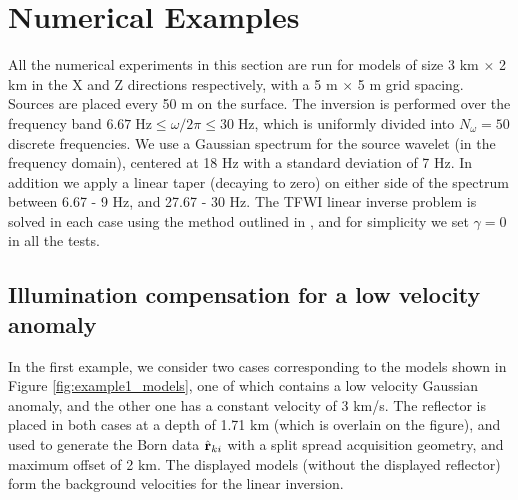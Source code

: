 \section{Numerical Examples}
\vspace*{-0.2cm}
All the numerical experiments in this section are run for models of size 3 km $\times$ 2 km in the X and Z directions respectively, with a 5 m $\times$ 5 m grid spacing. Sources are placed every 50 m on the surface. The inversion is performed over the frequency band $6.67 \; \text{Hz} \leq \omega / 2 \pi \leq 30 \; \text{Hz}$, which is uniformly divided into $N_\omega = 50$ discrete frequencies. We use a Gaussian spectrum for the source wavelet (in the frequency domain), centered at 18 Hz with a standard deviation of 7 Hz. In addition we apply a linear taper (decaying to zero) on either side of the spectrum between 6.67 - 9 Hz, and 27.67 - 30 Hz. The TFWI linear inverse problem is solved in each case using the method outlined in \cite{Sarkar.sep.172.rahul1}, and for simplicity we set $\gamma = 0$ in all the tests.

\vspace*{-0.4cm}


\subsection{Illumination compensation for a low velocity anomaly}

\vspace*{-0.1cm}
In the first example, we consider two cases corresponding to the models shown in Figure \ref{fig:example1_models}, one of which contains a low velocity Gaussian anomaly, and the other one has a constant velocity of 3 km/s. The reflector is placed in both cases at a depth of 1.71 km (which is overlain on the figure), and used to generate the Born data $\hat{\mathbf{r}}_{ki}$ with a split spread acquisition geometry, and maximum offset of 2 km. The displayed models (without the displayed reflector) form the background velocities for the linear inversion. 

\vspace*{-0.3cm}

\vspace*{-0.3cm}


